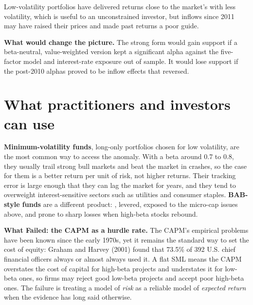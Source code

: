 Low-volatility portfolios have delivered returns close to the market's with less volatility, which is useful to an unconstrained investor, but inflows since 2011 may have raised their prices and made past returns a poor guide.

\textbf{What would change the picture.} The strong form would gain support if a beta-neutral, value-weighted version kept a significant alpha against the five-factor model and interest-rate exposure out of sample. It would lose support if the post-2010 alphas proved to be inflow effects that reversed.

\section{What practitioners and investors can use}
\label{sec:18-investors}

\textbf{Minimum-volatility funds}, long-only portfolios chosen for low volatility, are the most common way to access the anomaly. With a beta around 0.7 to 0.8, they usually trail strong bull markets and beat the market in crashes, so the case for them is a better return per unit of risk, not higher returns. Their tracking error is large enough that they can lag the market for years, and they tend to overweight interest-sensitive sectors such as utilities and consumer staples. \textbf{BAB-style funds} are a different product: , levered, exposed to the micro-cap issues above, and prone to sharp losses when high-beta stocks rebound.

\begin{callout}
\textbf{What Failed: the CAPM as a hurdle rate.} The CAPM's empirical problems have been known since the early 1970s, yet it remains the standard way to set the cost of equity: Graham and Harvey (2001) found that 73.5\% of 392 U.S. chief financial officers always or almost always used it. A flat SML means the CAPM overstates the cost of capital for high-beta projects and understates it for low-beta ones, so firms may reject good low-beta projects and accept poor high-beta ones. The failure is treating a model of \emph{risk} as a reliable model of \emph{expected return} when the evidence has long said otherwise.
\end{callout}

\makeatletter
{}
\makeatother

